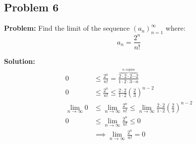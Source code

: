 \documentclass{article}
\begin{document}
\subsection*{Problem 6}
\noindent\textbf{Problem:} Find the limit of the sequence $(a_n)_{n=1}^\infty$ where:
$$a_n=\frac{2^n}{n!}$$

\noindent\textbf{Solution:} 
\begin{align*}
  0&\le\frac{2^n}{n!}=\frac{\overbrace{2\cdot2\cdot2\cdots2}^{\text{$n$ copies}}}{1\cdot2\cdot3\cdots n}\tag{$n>0$}\\
  0&\le\frac{2^n}{n!}\le\frac{2\cdot2}{1\cdot2}\left(\frac23\right)^{n-2}\\
  \lim_{n\to\infty}0&\le\lim_{n\to\infty}\frac{2^n}{n!}\le\lim_{n\to\infty}\frac{2\cdot2}{1\cdot2}\left(\frac23\right)^{n-2}\tag{squeeze theorem}\\
  0&\le\lim_{n\to\infty}\frac{2^n}{n!}\le0\\
  &\implies\lim_{n\to\infty}\frac{2^n}{n!}=0
\end{align*}
\end{document}
